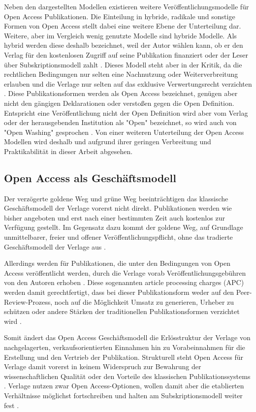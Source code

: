 Neben den dargestellten Modellen existieren weitere Veröffentlichungsmodelle für Open Access Publikationen. Die Einteilung in hybride, radikale und sonstige Formen von Open Access stellt dabei eine weitere Ebene der Unterteilung dar. Weitere, aber im Vergleich wenig genutzte Modelle sind hybride Modelle. Als hybrid werden diese deshalb bezeichnet, weil der Autor wählen kann, ob er den Verlag für den kostenlosen Zugriff auf seine Publikation finanziert oder der Leser über Subskriptionsmodell zahlt \cite{muller_2010_open}. Dieses Modell steht aber in der Kritik, da die rechtlichen Bedingungen nur selten eine Nachnutzung oder Weiterverbreitung erlauben und die Verlage nur selten auf das exklusive Verwertungsrecht verzichten \cite{muller_2010_open}. Diese Publikationsformen werden als Open Access bezeichnet, genügen aber nicht den gängigen Deklarationen \cite{boai_2012} oder verstoßen gegen die Open Definition. Entspricht eine Veröffentlichung nicht der Open Definition wird aber vom Verlag oder der herausgebenden Institution als "Open" bezeichnet, so wird auch von "Open Washing" gesprochen \cite{suchen}. Von einer weiteren Unterteilung der Open Access Modellen wird deshalb und aufgrund ihrer geringen Verbreitung und Praktikabilität in dieser Arbeit abgesehen.

\subsection{Open Access als Geschäftsmodell}
Der verzögerte goldene Weg und grüne Weg beeinträchtigen das klassische Geschäftsmodell der Verlage vorerst nicht direkt. Publikationen werden wie bisher angeboten und erst nach einer bestimmten Zeit auch kostenlos zur Verfügung gestellt. Im Gegensatz dazu kommt der goldene Weg, auf Grundlage unmittelbarer, freier und offener Veröffentlichungspflicht, ohne das tradierte Geschäftsmodell der Verlage aus \cite{lewis_2012_inevitability}.

Allerdings werden für Publikationen, die unter den Bedingungen von Open Access veröffentlicht werden, durch die Verlage vorab Veröffentlichungsgebühren von den Autoren erhoben \cite{suchen}. Diese sogenannten article processing charges (APC) werden damit gerechtfertigt, dass bei dieser Publikationsform weder auf den Peer-Review-Prozess, noch auf die Möglichkeit Umsatz zu generieren, Urheber zu schützen oder andere Stärken der traditionellen Publikationsformen verzichtet wird \cite{albert_2006_open_implications} \cite{Open_Access_net_2009}.

Somit ändert das Open Access Geschäftsmodell die Erlösstruktur der Verlage von nachgelagerten, verkaufsorientierten Einnahmen hin zu Vorabeinnahmen für die Erstellung und den Vertrieb der Publikation. Strukturell steht Open Access für Verlage damit vorerst in keinem Widerspruch zur Bewahrung der wissenschaftlichen Qualität oder den Vorteile des klassischen Publikationssystems \cite{Suber_2002}. Verlage nutzen zwar Open Access-Optionen, wollen damit aber die etablierten Verhältnisse möglichst fortschreiben und halten am Subskriptionsmodell weiter fest \cite{schmidt_2007_goldenen}.

